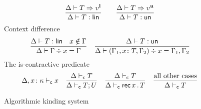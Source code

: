 \begin{figure}[h!]
  \begin{equation*}
    \frac{
      \algkindout T {v^\Lin}
    }{
      \isLin T
    }
    \qquad
    \frac{
      \algkindout T {v^\Un}
    }{
      \isUn T
    }
  \end{equation*}
  Context difference \hfill{}
  \begin{equation*}
    \frac{
      \isLin T
      \quad
      x\notin\Gamma
    }{
      \ctxdiff \Gamma x \Gamma
    }
    \quad
    \frac{
      \isUn T
    }{
      \ctxdiff {(\Gamma_1,x\colon T,\Gamma_2)} x {\Gamma_1,\Gamma_2}
    }
  \end{equation*}
  The is-contractive predicate \hfill{}
  \begin{equation*}
    \isContractive[\kindEnv,x\colon\kind]{x}
    \quad 
    \frac{
      \isContractive{T}
    }{
      \isContractive{T;U}
    }
    \quad
    \frac{
      \isContractive{T}
    }{
      \isContractive{\tRecK xT}
    }
    \quad
    \frac{\text{all other cases}}{\isContractive{T}}
  \end{equation*}
  \caption{Algorithmic kinding system}
  \label{fig:kinding-system}
\end{figure}

